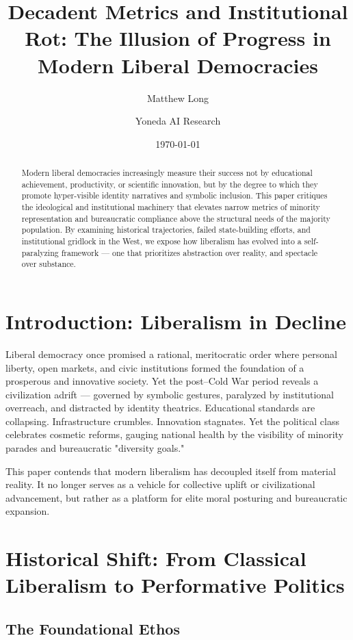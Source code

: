 \documentclass[11pt]{article}
\title{\textbf{Decadent Metrics and Institutional Rot: The Illusion of Progress in Modern Liberal Democracies}}
\author[1]{Matthew Long}
\author[1]{Yoneda AI Research}
\date{\today}
\begin{document}
\maketitle

\begin{abstract}
Modern liberal democracies increasingly measure their success not by educational achievement, productivity, or scientific innovation, but by the degree to which they promote hyper-visible identity narratives and symbolic inclusion. This paper critiques the ideological and institutional machinery that elevates narrow metrics of minority representation and bureaucratic compliance above the structural needs of the majority population. By examining historical trajectories, failed state-building efforts, and institutional gridlock in the West, we expose how liberalism has evolved into a self-paralyzing framework — one that prioritizes abstraction over reality, and spectacle over substance.
\end{abstract}

\section{Introduction: Liberalism in Decline}

Liberal democracy once promised a rational, meritocratic order where personal liberty, open markets, and civic institutions formed the foundation of a prosperous and innovative society. Yet the post–Cold War period reveals a civilization adrift — governed by symbolic gestures, paralyzed by institutional overreach, and distracted by identity theatrics. Educational standards are collapsing. Infrastructure crumbles. Innovation stagnates. Yet the political class celebrates cosmetic reforms, gauging national health by the visibility of minority parades and bureaucratic "diversity goals."

This paper contends that modern liberalism has decoupled itself from material reality. It no longer serves as a vehicle for collective uplift or civilizational advancement, but rather as a platform for elite moral posturing and bureaucratic expansion.

\section{Historical Shift: From Classical Liberalism to Performative Politics}

\subsection{The Foundational Ethos}
\end{document}

